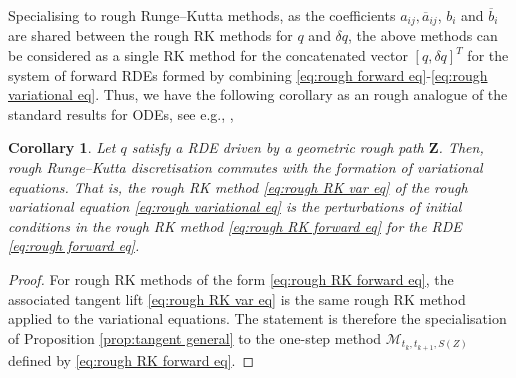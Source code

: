 \documentclass[11pt, oneside]{article}
\numberwithin{equation}{section}
\newtheorem{corollary}[lemma]{Corollary}
\theoremstyle{definition}
\newcommand{\ob}[1]{\overline{#1}}
\newcommand{\mc}[1]{\mathcal{#1}}
\newcommand{\mcal}[1]{\mc{#1}}
\begin{document}
Specialising to rough Runge--Kutta methods, as the coefficients $a_{ij}, \ob{a}_{ij}$, $b_i$ and $\ob{b}_i$ are shared between the rough RK methods for $q$ and $\delta q$, the above methods can be considered as a single RK method for the concatenated vector $[q, \delta q]^T$ for the system of forward RDEs formed by combining \eqref{eq:rough forward eq}-\eqref{eq:rough variational eq}. Thus, we have the following corollary as an rough analogue of the standard results for ODEs, see e.g., \cite[Chapter VI, Lem. 4.1]{Hairer2006},
\begin{corollary}\label{prop:tangent rough RK}
    Let $q$ satisfy a RDE driven by a geometric rough path $\mathbf{Z}$. Then, rough Runge--Kutta discretisation commutes with the formation of variational equations. That is, the rough RK method \eqref{eq:rough RK var eq} of the rough variational equation \eqref{eq:rough variational eq} is the perturbations of initial conditions in the rough RK method \eqref{eq:rough RK forward eq} for the RDE \eqref{eq:rough forward eq}.
\end{corollary} 
\begin{proof}
    For rough RK methods of the form \eqref{eq:rough RK forward eq}, the associated tangent lift \eqref{eq:rough RK var eq} is the same rough RK method applied to the variational equations. The statement is therefore the specialisation of Proposition \ref{prop:tangent general} to the one-step method $\mcal{M}_{t_k, t_{k+1}, S(Z)}$ defined by \eqref{eq:rough RK forward eq}.
\end{proof}
\end{document}
